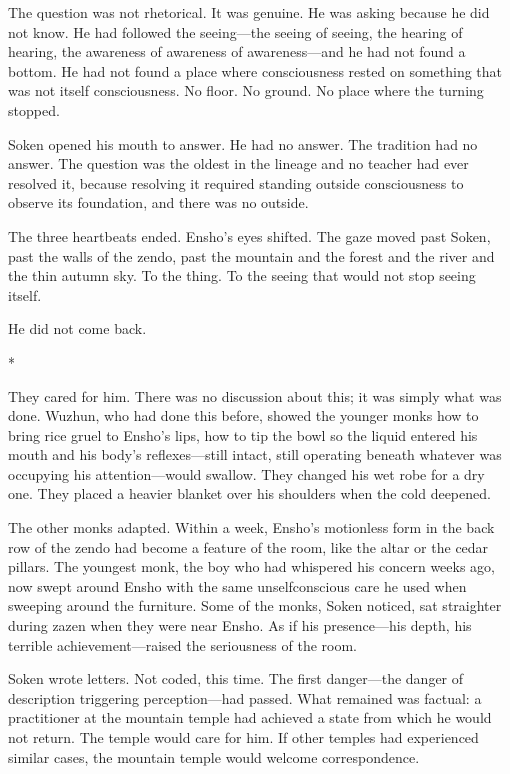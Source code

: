 The question was not rhetorical. It was genuine. He was asking because he did not know. He had followed the seeing---the seeing of seeing, the hearing of hearing, the awareness of awareness of awareness---and he had not found a bottom. He had not found a place where consciousness rested on something that was not itself consciousness. No floor. No ground. No place where the turning stopped.

Soken opened his mouth to answer. He had no answer. The tradition had no answer. The question was the oldest in the lineage and no teacher had ever resolved it, because resolving it required standing outside consciousness to observe its foundation, and there was no outside.

The three heartbeats ended. Ensho's eyes shifted. The gaze moved past Soken, past the walls of the zendo, past the mountain and the forest and the river and the thin autumn sky. To the thing. To the seeing that would not stop seeing itself.

He did not come back.

\begin{center}
*\quad*\quad*
\end{center}

They cared for him. There was no discussion about this; it was simply what was done. Wuzhun, who had done this before, showed the younger monks how to bring rice gruel to Ensho's lips, how to tip the bowl so the liquid entered his mouth and his body's reflexes---still intact, still operating beneath whatever was occupying his attention---would swallow. They changed his wet robe for a dry one. They placed a heavier blanket over his shoulders when the cold deepened.

The other monks adapted. Within a week, Ensho's motionless form in the back row of the zendo had become a feature of the room, like the altar or the cedar pillars. The youngest monk, the boy who had whispered his concern weeks ago, now swept around Ensho with the same unselfconscious care he used when sweeping around the furniture. Some of the monks, Soken noticed, sat straighter during zazen when they were near Ensho. As if his presence---his depth, his terrible achievement---raised the seriousness of the room.

Soken wrote letters. Not coded, this time. The first danger---the danger of description triggering perception---had passed. What remained was factual: a practitioner at the mountain temple had achieved a state from which he would not return. The temple would care for him. If other temples had experienced similar cases, the mountain temple would welcome correspondence.


